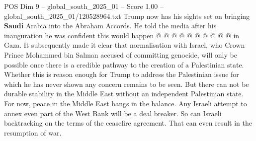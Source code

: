 \begin{textsample}{POS Dim 9 – global\_south\_2025\_01 – Score 1.00 – global\_south\_2025\_01/120528964.txt}
Trump now has his sights set on bringing \textbf{Saudi} Arabia into the Abraham Accords.
He told the media after his inauguration he was confident this would happen @ @ @ @ @ @ @ @ @ @ in Gaza.
It subsequently made it clear that normalisation with Israel, who Crown Prince Mohammed bin Salman accused of committing genocide, will only be possible once there is a credible pathway to the creation of a Palestinian state.
Whether this is reason enough for Trump to address the Palestinian issue for which he has never shown any concern remains to be seen.
But there can not be durable stability in the Middle East without an independent Palestinian state.
For now, peace in the Middle East hangs in the balance.
Any Israeli attempt to annex even part of the West Bank will be a deal breaker.
So can Israeli backtracking on the terms of the ceasefire agreement.
That can even result in the resumption of war.

\end{textsample}
